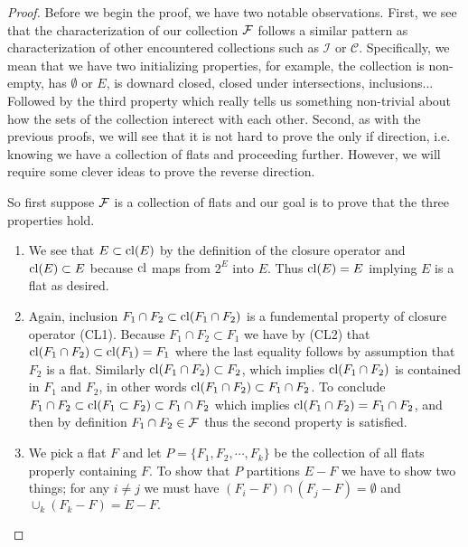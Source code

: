 \begin{proof}
Before we begin the proof, we have two notable observations. First, we see that the characterization of our collection $\mathcal{F}$ follows a similar pattern as characterization of other encountered collections such as $\mathcal{I}$ or $\mathcal{C}$. Specifically, we mean that we have two initializing properties, for example, the collection is non-empty, has $\emptyset$ or $E$, is downard closed, closed under intersections, inclusions... Followed by the third property which really tells us something non-trivial about how the sets of the collection interect with each other. 
Second, as with the previous proofs, we will see that it is not hard to prove the only if direction, i.e. knowing we have a collection of flats and proceeding further. However, we will require some clever ideas to prove the reverse direction.

So first suppose $\mathcal{F}$ is a collection of flats and our goal is to prove that the three properties hold. 

\begin{enumerate}
    \item We see that $E \subset \mathrm{cl}(E)$ by the definition of the closure operator and $\mathrm{cl}(E)\subset E$ because $\mathrm{cl}$ maps from $2^E$ into $E.$ Thus $\mathrm{cl}(E)= E$ implying $E$ is a flat as desired.
    
    \item Again, inclusion $F_1 \cap F_2 \subset \mathrm{cl}(F_1 \cap F_2)$ is a fundemental property of closure operator (CL1). Because $F_1 \cap F_2 \subset F_1$ we have by (CL2) that $\mathrm{cl}(F_1 \cap F_2) \subset \mathrm{cl}(F_1) = F_1$ where the last equality follows by assumption that $F_2$ is a flat. Similarly $\mathrm{cl}(F_1\cap F_2) \subset F_2$, which implies $\mathrm{cl}(F_1\cap F_2)$ is contained in $F_1$ and $F_2$, in other words $\mathrm{cl}(F_1 \cap F_2) \subset F_1 \cap F_2$. To conclude $F_1 \cap F_2 \subset \mathrm{cl}(F_1 \subset F_2) \subset F_1 \cap F_2$ which implies $\mathrm{cl}(F_1 \cap F_2) = F_1 \cap F_2$, and then by definition $F_1 \cap F_2 \in \mathcal{F}$ thus the second property is satisfied.

    \item We pick a flat $F$ and let $P = \{F_1, F_2, \cdots, F_k\}$ be the collection of all flats properly containing $F$. To show that $P$ partitions $E - F$ we have to show two things; for any $i \neq j$ we must have $(F_i - F)\cap( F_j - F) = \emptyset$ and $\cup_{k}( F_k - F) = E - F.$ 
    

\end{enumerate}
\end{proof}
